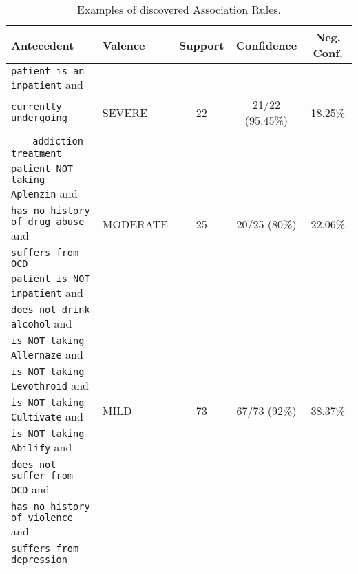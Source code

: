  \begin{table}
     \centering
     \begin{tabular}{|l|l|c|c|c|}
    \hline
    \textsf{Antecedent}& \textsf{Valence} & \textsf{Support}& \textsf{Confidence}&
    \textsf{Neg. Conf.}\\
    \hline
    \texttt{patient is an inpatient} and  &    &     &   & \\
    \texttt{currently undergoing}& \textsf{SEVERE} & 22 & 21/22 (95.45\%)& 18.25\%\\
    $\ \ \ \ \ $ \texttt{ addiction treatment} & & & & \\
    \hline
    \texttt{patient NOT taking Aplenzin} and &   & & & \\
    \texttt{has no history of drug abuse} and & \textsf{MODERATE} & 25 & 20/25 (80\%) & 22.06\%\\
    \texttt{suffers from OCD} & & & & \\
    \hline
    \texttt{patient is NOT inpatient} and  & & & & \\
    \texttt{does not drink alcohol} and  & & & & \\
    \texttt{is NOT taking Allernaze} and  & & & & \\
    \texttt{is NOT taking Levothroid} and  & & & & \\
    \texttt{is NOT taking Cultivate} and & \textsf{MILD} & 73 & 67/73 (92\%)& 38.37\%\\
    \texttt{is NOT taking Abilify} and  & & & & \\
    \texttt{does not suffer from OCD} and  & & & & \\
    \texttt{has no history of violence} and & & & & \\
    \texttt{suffers from depression} & & & & \\
    \hline
     \end{tabular}
     \caption{Examples of discovered Association Rules.}
     \label{tab:ARexamples}
 \end{table}
 